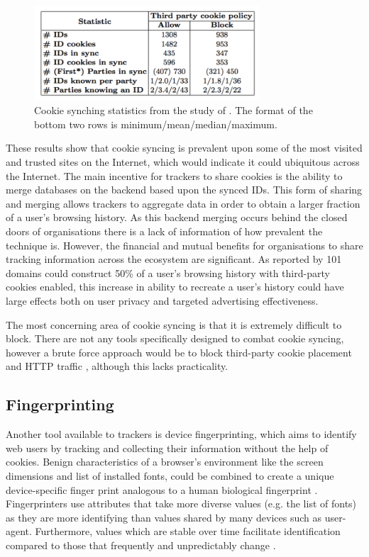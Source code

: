 \documentclass{article}
\begin{document}
\begin{figure}[H]
    \centering
    \includegraphics[width=0.75\textwidth]{cookieSynching}
    \caption{Cookie synching statistics from the study of \parencite{webNeverForgets}. The format of the bottom two rows is minimum/mean/median/maximum.}
    \label{fig:cookieSynching}
\end{figure}

These results show that cookie syncing is prevalent upon some of the most visited and trusted sites on the Internet, which would indicate it could ubiquitous across the Internet. The main incentive for trackers to share cookies is the ability to merge databases on the backend based upon the synced IDs. This form of sharing and merging allows trackers to aggregate data in order to obtain a larger fraction of a user's browsing history. As this backend merging occurs behind the closed doors of organisations there is a lack of information of how prevalent the technique is.  However, the financial and mutual benefits for organisations to share tracking information across the ecosystem are significant. As reported by \parencite{webNeverForgets}  101 domains could construct 50\% of a user's browsing history with third-party cookies enabled, this increase in ability to recreate a user's history could have large effects both on user privacy and targeted advertising effectiveness. \newline

The most concerning area of cookie syncing is that it is extremely difficult to block. There are not any tools specifically designed to combat cookie syncing, however a brute force approach would be to block third-party cookie placement and HTTP traffic \parencite{webNeverForgets}, although this lacks practicality. 

\subsection{Fingerprinting}
Another tool available to trackers is device fingerprinting, which aims to identify web users by tracking and collecting their information without the help of cookies. Benign characteristics of a browser's environment like the screen dimensions and list of installed fonts, could be combined to create a unique device-specific finger print analogous to a human biological fingerprint \parencite{uniqueBrowser}. Fingerprinters use attributes that take more diverse values (e.g. the list of fonts) as they are more identifying than values shared by many devices such as user-agent. Furthermore, values which are stable over time facilitate identification compared to those that frequently and unpredictably change \parencite{dustingFP}. 
\end{document}
